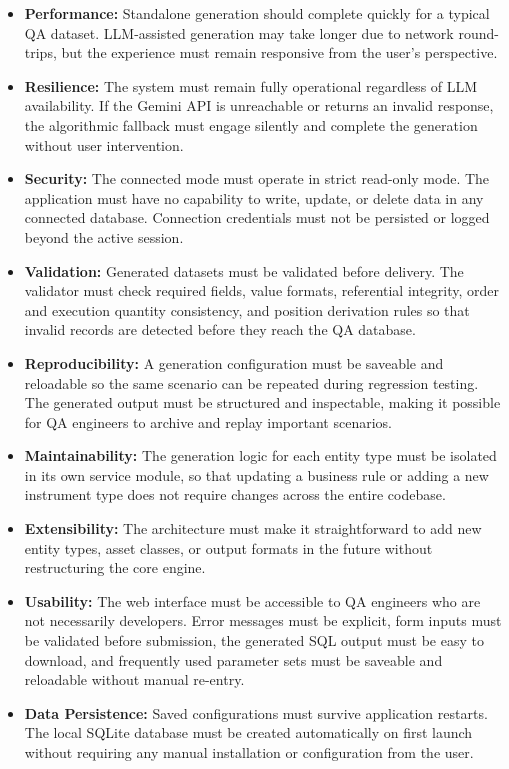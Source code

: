 \begin{itemize}
    \item \textbf{Performance:} Standalone generation should complete
    quickly for a typical QA dataset. LLM-assisted generation may take
    longer due to network round-trips, but the experience must remain
    responsive from the user's perspective.

    \item \textbf{Resilience:} The system must remain fully operational
    regardless of LLM availability. If the Gemini API is unreachable or
    returns an invalid response, the algorithmic fallback must engage silently
    and complete the generation without user intervention.

    \item \textbf{Security:} The connected mode must operate in strict
    read-only mode. The application must have no capability to write, update,
    or delete data in any connected database. Connection credentials must not
    be persisted or logged beyond the active session.

    \item \textbf{Validation:} Generated datasets must be validated before
    delivery. The validator must check required fields, value formats,
    referential integrity, order and execution quantity consistency, and
    position derivation rules so that invalid records are detected before
    they reach the QA database.

    \item \textbf{Reproducibility:} A generation configuration must be
    saveable and reloadable so the same scenario can be repeated during
    regression testing. The generated output must be structured and
    inspectable, making it possible for QA engineers to archive and replay
    important scenarios.

    \item \textbf{Maintainability:} The generation logic for each entity type
    must be isolated in its own service module, so that updating a business
    rule or adding a new instrument type does not require changes across the
    entire codebase.

    \item \textbf{Extensibility:} The architecture must make it
    straightforward to add new entity types, asset classes, or output formats
    in the future without restructuring the core engine.

    \item \textbf{Usability:} The web interface must be accessible to QA
    engineers who are not necessarily developers. Error messages must be
    explicit, form inputs must be validated before submission, the generated
    SQL output must be easy to download, and frequently used parameter sets
    must be saveable and reloadable without manual re-entry.

    \item \textbf{Data Persistence:} Saved configurations must survive
    application restarts. The local SQLite database must be created
    automatically on first launch without requiring any manual installation
    or configuration from the user.
\end{itemize}


